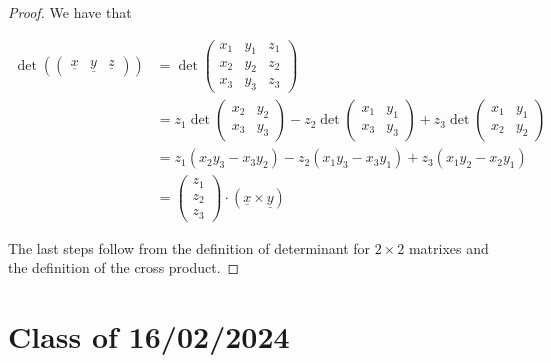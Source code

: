 \documentclass[10pt]{extarticle}
\begin{document}
\begin{proof}
    We have that

    \begin{align*}
        \det \left( \begin{pmatrix}
                            \underline{x} & \underline{y} & \underline{z}
                        \end{pmatrix} \right)
         & = \det \begin{pmatrix}
                      x_1 & y_1 & z_1 \\
                      x_2 & y_2 & z_2 \\
                      x_3 & y_3 & z_3
                  \end{pmatrix}                                                        \\
         & = z_1 \det \begin{pmatrix}
                          x_2 & y_2 \\
                          x_3 & y_3
                      \end{pmatrix}
        - z_2 \det \begin{pmatrix}
                       x_1 & y_1 \\
                       x_3 & y_3
                   \end{pmatrix}
        + z_3 \det \begin{pmatrix}
                       x_1 & y_1 \\
                       x_2 & y_2
                   \end{pmatrix}                                                        \\
         & = z_1 (x_2 y_3 - x_3 y_2) - z_2 (x_1 y_3 - x_3 y_1) + z_3 (x_1 y_2 - x_2 y_1) \\
         & = \begin{pmatrix}
                 z_1 \\ z_2 \\ z_3
             \end{pmatrix} \cdot (\underline{x} \times \underline{y})
    \end{align*}

    The last steps follow from the definition of determinant for $2 \times 2$ matrixes and the definition of the cross product.
\end{proof}



\section{Class of 16/02/2024}
\end{document}
